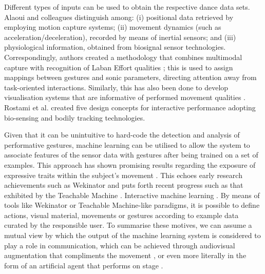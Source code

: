 Different types of inputs can be used to obtain the respective dance data sets. Alaoui and colleagues \cite{fdili_alaoui_seeing_2017} distinguish among: (i) positional data retrieved by employing motion capture systems; (ii) movement dynamics (such as acceleration/deceleration), recorded by means of inertial sensors; and (iii) physiological information, obtained from biosignal sensor technologies. Correspondingly, authors created a methodology that combines multimodal capture with recognition of Laban Effort qualities \cite{fdili_alaoui_seeing_2017}; this is used to assign mappings between gestures and sonic parameters, directing attention away from task-oriented interactions. Similarly, this has also been done to develop visualisation systems that are informative of performed movement qualities \cite{alaoui_interactive_2015,hussain_evaluating_2019,jego_workflow_2019}. Rostami et al. \cite{rostami_bio-sensed_2017} created five design concepts for interactive performance adopting bio-sensing and bodily tracking technologies.

Given that it can be unintuitive to hard-code the detection and analysis of performative gestures, machine learning can be utilised to allow the system to associate features of the sensor data with gestures after being trained on a set of examples. This approach has shown promising results regarding the exposure of expressive traits within the subject's movement \cite{caramiaux_understanding_2015}. This echoes early research achievements such as Wekinator \cite{fiebrink_rebecca_reflections_2020} and puts forth recent progress such as that exhibited by the Teachable Machine \cite{carney_teachable_2020}. Interactive machine learning \cite{fails_interactive_2003}. By means of tools like Wekinator or Teachable Machine-like paradigms, it is possible to define actions, visual material, movements or gestures according to example data curated by the responsible user.
To summarise these motives, we can assume a mutual view by which the output of the machine learning system is considered to play a role in communication, which can be achieved through audiovisual augmentation that compliments the movement \cite{francoise_coda_2022}, or even more literally in the form of an artificial agent that performs on stage \cite{liapis_learning_2018}.

